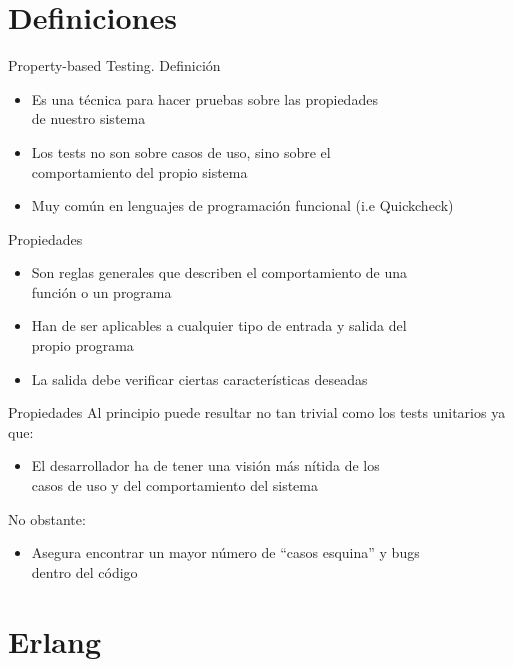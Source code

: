 \documentclass{beamer}
\begin{document}
  \section{Definiciones}
    \begin{frame}{Property-based Testing. Definición}
      \begin{itemize}
        \item Es una técnica para hacer pruebas sobre las propiedades\\
        de nuestro sistema
        \item Los tests no son sobre casos de uso, sino sobre el\\
        comportamiento del propio sistema
        \item Muy común en lenguajes de programación funcional (i.e Quickcheck)
      \end{itemize}
    \end{frame}
    \begin{frame}{Propiedades}
      \begin{itemize}
        \item Son reglas generales que describen el comportamiento de una\\
        función o un programa
        \item Han de ser aplicables a cualquier tipo de entrada y salida del\\
        propio programa
        \item La salida debe verificar ciertas características deseadas
      \end{itemize}
    \end{frame}
    \begin{frame}{Propiedades}
      Al principio puede resultar no tan trivial como los tests unitarios ya que:
      \begin{itemize}
        \item El desarrollador ha de tener una visión más nítida de los\\
        casos de uso y del comportamiento del sistema
      \end{itemize}
      No obstante:
      \begin{itemize}
        \item Asegura encontrar un mayor número de ``casos esquina'' y bugs\\
        dentro del código
      \end{itemize}
    \end{frame}
  \section{Erlang}
\end{document}
